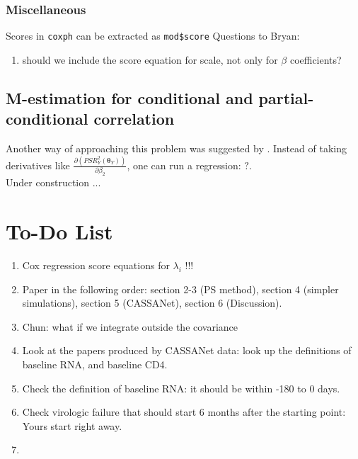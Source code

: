 \documentclass[]{article}
\begin{document}
\clearpage

\subsubsection{Miscellaneous}
Scores in \texttt{coxph} can be extracted as \texttt{mod\$score}
Questions to Bryan:
\begin{enumerate}[1)]
  \item should we include the score equation for scale, not only for $\beta$ coefficients?
\end{enumerate}

\subsection{M-estimation for conditional and partial-conditional correlation}
Another way of approaching this problem was suggested by \cite{lui2015covariate}. Instead of taking derivatives like $\frac{\partial (PSR_Y^2(\pmb{\theta}_Y))}{\partial \beta_2}$, one can run a regression: $?$.\\
Under construction ...


\section{To-Do List}
\begin{enumerate}
  \item Cox regression score equations for $\lambda_i$ !!!
  \item Paper in the following order: section 2-3 (PS method), section 4 (simpler simulations), section 5 (CASSANet), section 6 (Discussion).
  \item Chun: what if we integrate outside the covariance
  \item Look at the papers produced by CASSANet data: look up the definitions of baseline RNA, and baseline CD4.
  \item Check the definition of baseline RNA: it should be within -180 to 0 days.
  \item Check virologic failure that should start 6 months after the starting point: Yours start right away.
  \item
\end{enumerate}
\end{document}
